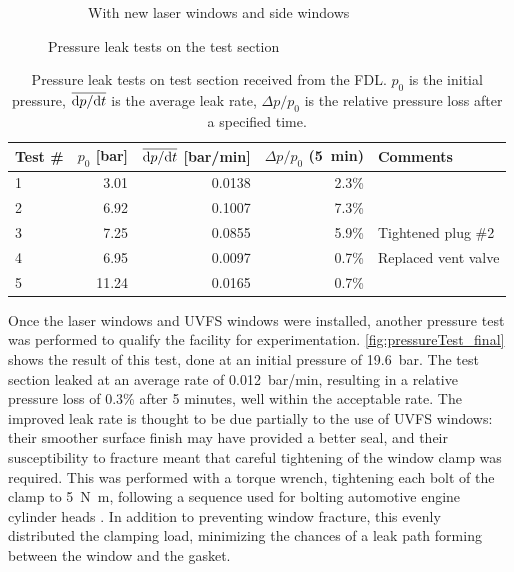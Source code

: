 \begin{figure}[h]
\begin{subfigure}[t]{0.47\textwidth}
                    \caption{With new laser windows and side windows}
                    \label{fig:pressureTest_final}
                \end{subfigure}
                \caption{Pressure leak tests on the test section}
                \label{fig:pressureTest}
            \end{figure}

            \begin{table}[h]
                \centering
                \caption[Pressure leak tests on test section]{Pressure leak tests on test section received from the FDL. $p_0$ is the initial pressure, $\overline{\mathrm{d}p/\mathrm{d}t}$ is the average leak rate, $\Delta p/p_0$ is the relative pressure loss after a specified time.}
                \label{tab:pressureTests_og}
                \begin{tabular}{lrrrl}
                    \toprule
                    Test \#  & $p_0$ [bar]  & $\overline{\mathrm{d}p/\mathrm{d}t}$ [bar/min]   & $\Delta p/p_0$ (5~min) & Comments \\
                    \midrule
                    1   & 3.01  & 0.0138    & 2.3\%    &   \\
                    2   & 6.92  & 0.1007    & 7.3\%    &   \\
                    3   & 7.25  & 0.0855    & 5.9\%    & Tightened plug \#2  \\
                    4   & 6.95  & 0.0097    & 0.7\%    & Replaced vent valve  \\
                    5   & 11.24 & 0.0165    & 0.7\%    &   \\
                    \bottomrule
                \end{tabular}
            \end{table}

            Once the laser windows and UVFS windows were installed, another pressure test was performed to qualify the facility for experimentation. \autoref{fig:pressureTest_final} shows the result of this test, done at an initial pressure of \qty{19.6}{bar}. The test section leaked at an average rate of \qty{0.012}{bar/min}, resulting in a relative pressure loss of 0.3\% after 5 minutes, well within the acceptable rate. The improved leak rate is thought to be due partially to the use of UVFS windows: their smoother surface finish may have provided a better seal, and their susceptibility to fracture meant that careful tightening of the window clamp was required. This was performed with a torque wrench, tightening each bolt of the clamp to \qty{5}{N.m}, following a sequence used for bolting automotive engine cylinder heads
            . In addition to preventing window fracture, this evenly distributed the clamping load, minimizing the chances of a leak path forming between the window and the gasket.

